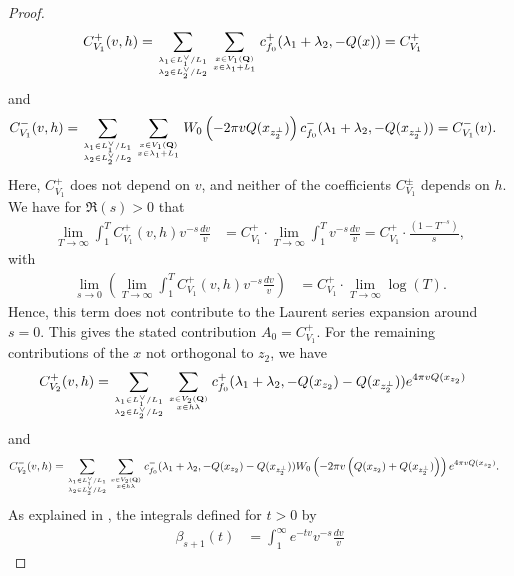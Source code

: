 \documentclass{amsart}
\theoremstyle{definition}
\begin{document}
\begin{proof}
\begin{align*} C_{ V_1 }^+(v, h) &= \sum\limits_{ \lambda_1 \in L_1^{\vee}/L_{1} \atop \lambda_2 \in L_2^{\vee}/L_2  }
\sum\limits_{x \in V_1 ({\bf{Q}}) \atop x \in \lambda_1 + L_1} c_{f_0}^+(\lambda_1 + \lambda_2, -Q(x) ) = C_{V_1}^+ \end{align*}
and 
\begin{align*} C_{ V_1 }^-(v, h) &= \sum\limits_{ \lambda_1 \in L_1^{\vee}/L_1 \atop \lambda_2 \in L_2^{\vee}/L_2  }
\sum\limits_{x \in V_1({\bf{Q}}) \atop x \in \lambda_1 + L_1} W_{0} \left( - 2 \pi v Q(x_{z_2^{\perp}}) \right)
c_{f_{0}}^-(\lambda_1 + \lambda_2, -Q(x_{z_2^{\perp}})) = C_{V_1}^-(v).\end{align*} 
Here, $C_{V_1}^+$ does not depend on $v$, and neither of the coefficients $C_{V_1}^{\pm}$ depends on $h$. We have for $\Re(s) >0$ that 
\begin{align*} \lim_{T \rightarrow \infty} \int_1^T C^+_{V_1}(v, h) v^{-s} \frac{dv}{v} 
&= C^+_{V_1} \cdot \lim_{T \rightarrow \infty} \int_1^T v^{-s} \frac{dv}{v} = C^+_{V_1} \cdot \frac{ \left( 1-T^{-s} \right)}{s}, \end{align*}
with 
\begin{align*} \lim_{s \rightarrow 0} \left( \lim_{T \rightarrow \infty} \int_1^T C^+_{V_1}(v, h) v^{-s} \frac{dv}{v} \right) 
&= C^+_{V_1} \cdot \lim_{T \rightarrow \infty} \log(T). \end{align*}
Hence, this term does not contribute to the Laurent series expansion around $s=0$. This gives the stated contribution $A_0=C_{V_1}^+$.
For the remaining contributions of the $x$ not orthogonal to $z_2$, we have 
\begin{align*} C_{V_2}^+(v, h) &= \sum\limits_{ \lambda_1 \in L_1^{\vee}/L_1 \atop  \lambda_2 \in L_2^{\vee}/L_2} \sum\limits_{ x \in V_2({\bf{Q}}) \atop x \in h \lambda  }
c_{f_0}^+( \lambda_1 + \lambda_2, -Q( x_{z_2} ) - Q( x_{ z_2^{\perp} } ) ) e^{4 \pi v Q(x_{z_2}) } \end{align*}
and 
\begin{align*} C_{V_2}^-(v, h) &= \sum\limits_{ \lambda_1 \in L_1^{\vee}/L_1 \atop  \lambda_2 \in L_2^{\vee}/L_{2}} \sum\limits_{ x \in V_2({\bf{Q}}) \atop x \in h \lambda  }
c_{f_{0}}^-(\lambda_1 + \lambda_2, -Q(x_{z_2} ) - Q(x_{z_2^{\perp}})) W_{0} \left( - 2 \pi v \left( Q(x_{z_2}) + Q(x_{z_2^{\perp}}) \right)  \right)e^{4 \pi v Q(x_{z_2})}.\end{align*}
As explained in \cite[Proposition 2.5]{KuBL}, the integrals defined for $t>0$ by 
\begin{align*} \beta_{s+1}(t) &= \int_1^{\infty} e^{-t v} v^{-s} \frac{dv}{v} \end{align*}

\end{proof}
\end{document}
